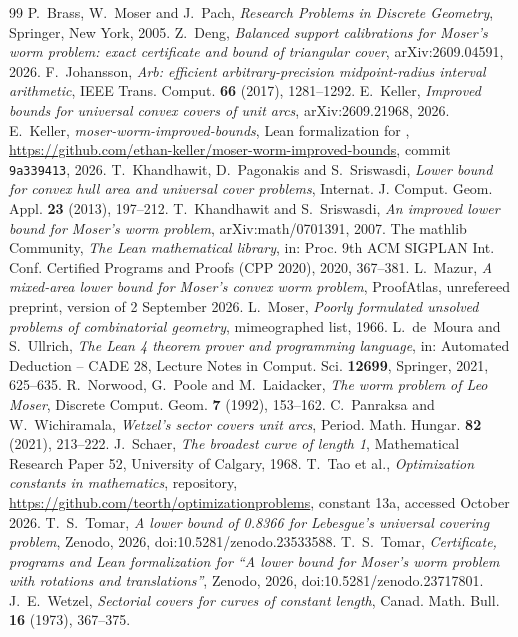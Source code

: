 \documentclass[11pt]{amsart}
\theoremstyle{definition}
\theoremstyle{remark}
\numberwithin{equation}{section}
\newcommand{\ZENODODOI}{10.5281/zenodo.23717801}   %
\begin{document}
\begin{thebibliography}{99}
 P.~Brass, W.~Moser and J.~Pach, \emph{Research Problems in Discrete Geometry}, Springer, New York, 2005.
 Z.~Deng, \emph{Balanced support calibrations for Moser's worm problem: exact certificate and bound of triangular cover}, arXiv:2609.04591, 2026.
 F.~Johansson, \emph{Arb: efficient arbitrary-precision midpoint-radius interval arithmetic}, IEEE Trans. Comput. \textbf{66} (2017), 1281--1292.
 E.~Keller, \emph{Improved bounds for universal convex covers of unit arcs}, arXiv:2609.21968, 2026.
 E.~Keller, \emph{moser-worm-improved-bounds}, Lean formalization for \cite{Kel26}, \url{https://github.com/ethan-keller/moser-worm-improved-bounds}, commit \texttt{9a339413}, 2026.
 T.~Khandhawit, D.~Pagonakis and S.~Sriswasdi, \emph{Lower bound for convex hull area and universal cover problems}, Internat. J. Comput. Geom. Appl. \textbf{23} (2013), 197--212.
 T.~Khandhawit and S.~Sriswasdi, \emph{An improved lower bound for Moser's worm problem}, arXiv:math/0701391, 2007.
 The mathlib Community, \emph{The Lean mathematical library}, in: Proc. 9th ACM SIGPLAN Int. Conf. Certified Programs and Proofs (CPP 2020), 2020, 367--381.
 L.~Mazur, \emph{A mixed-area lower bound for Moser's convex worm problem}, ProofAtlas, unrefereed preprint, version of 2 September 2026.
 L.~Moser, \emph{Poorly formulated unsolved problems of combinatorial geometry}, mimeographed list, 1966.
 L.~de~Moura and S.~Ullrich, \emph{The Lean 4 theorem prover and programming language}, in: Automated Deduction -- CADE 28, Lecture Notes in Comput. Sci. \textbf{12699}, Springer, 2021, 625--635.
 R.~Norwood, G.~Poole and M.~Laidacker, \emph{The worm problem of Leo Moser}, Discrete Comput. Geom. \textbf{7} (1992), 153--162.
 C.~Panraksa and W.~Wichiramala, \emph{Wetzel's sector covers unit arcs}, Period. Math. Hungar. \textbf{82} (2021), 213--222.
 J.~Schaer, \emph{The broadest curve of length 1}, Mathematical Research Paper 52, University of Calgary, 1968.
 T.~Tao et al., \emph{Optimization constants in mathematics}, repository, \url{https://github.com/teorth/optimizationproblems}, constant 13a, accessed October 2026.
 T.~S.~Tomar, \emph{A lower bound of 0.8366 for Lebesgue's universal covering problem}, Zenodo, 2026, doi:10.5281/zenodo.23533588.
 T.~S.~Tomar, \emph{Certificate, programs and Lean formalization for ``A lower bound for Moser's worm problem with rotations and translations''}, Zenodo, 2026, doi:\ZENODODOI.
 J.~E.~Wetzel, \emph{Sectorial covers for curves of constant length}, Canad. Math. Bull. \textbf{16} (1973), 367--375.
\end{thebibliography}
\end{document}
